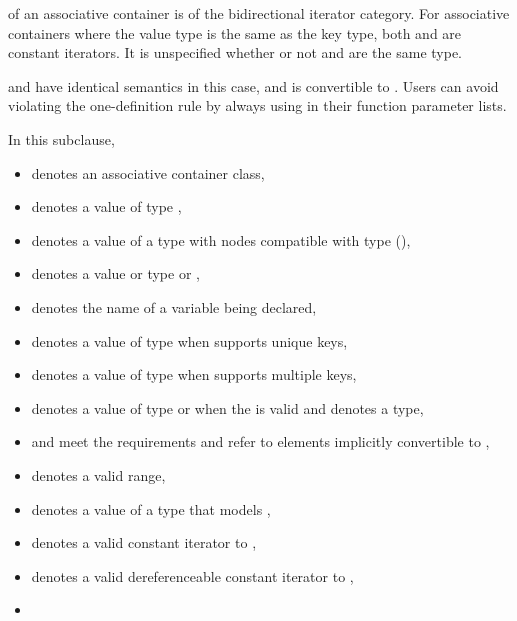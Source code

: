 \pnum
{}
of an associative container is of the bidirectional iterator category.
For associative containers where the value type is the same as the key type, both
and
are constant iterators. It is unspecified whether or not
and
are the same type.
\begin{note}
 and  have identical semantics in this case, and  is convertible to . Users can avoid violating the one-definition rule by always using  in their function parameter lists.
\end{note}

\pnum
In this subclause,
\begin{itemize}
\item
{} denotes an associative container class,
\item
{} denotes a value of type ,
\item
{} denotes a value of a type with nodes compatible with type
 (),
\item
{} denotes a value or type  or ,
\item
{} denotes the name of a variable being declared,
\item
{} denotes a value of type 
when  supports unique keys,
\item
{} denotes a value of type 
when  supports multiple keys,
\item
{} denotes a value of type  or 
when the 
 is valid
and denotes a type,
\item
{} and 
meet the  requirements and refer to elements
implicitly convertible to
,
\item
{} denotes a valid range,
\item
{} denotes a value of a type 
that models ,
\item
{} denotes a valid constant iterator to ,
\item
{} denotes a valid dereferenceable constant iterator to ,
\item

\end{itemize}
